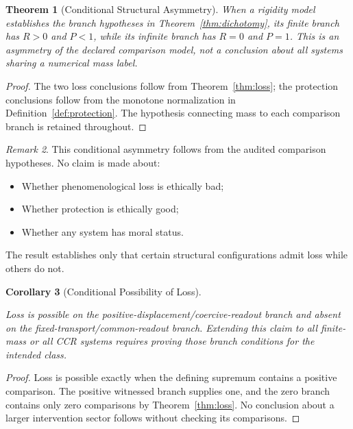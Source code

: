 \documentclass[11pt,a4paper]{article}
\theoremstyle{plain}
\newtheorem{theorem}{Theorem}[section]
\newtheorem{corollary}[theorem]{Corollary}
\theoremstyle{definition}
\theoremstyle{remark}
\newtheorem{remark}[theorem]{Remark}
\begin{document}
\begin{theorem}[Conditional Structural Asymmetry]\label{thm:asymmetry}
When a rigidity model establishes the branch hypotheses in Theorem~\ref{thm:dichotomy}, its finite branch has $R>0$ and $P<1$, while its infinite branch has $R=0$ and $P=1$. This is an asymmetry of the declared comparison model, not a conclusion about all systems sharing a numerical mass label.
\end{theorem}

\begin{proof}
The two loss conclusions follow from Theorem~\ref{thm:loss}; the protection conclusions follow from the monotone normalization in Definition~\ref{def:protection}. The hypothesis connecting mass to each comparison branch is retained throughout.
\end{proof}

\begin{remark}
This conditional asymmetry follows from the audited comparison hypotheses. No claim is made about:
\begin{itemize}[leftmargin=*]
    \item Whether phenomenological loss is ethically bad;
    \item Whether protection is ethically good;
    \item Whether any system has moral status.
\end{itemize}
The result establishes only that certain structural configurations admit loss while others do not.
\end{remark}

\begin{corollary}[Conditional Possibility of Loss]\label{cor:loss-possibility}\leavevmode\par
Loss is possible on the positive-displacement/coercive-readout branch and absent on the fixed-transport/common-readout branch. Extending this claim to all finite-mass or all CCR systems requires proving those branch conditions for the intended class.
\end{corollary}

\begin{proof}
Loss is possible exactly when the defining supremum contains a positive
comparison. The positive witnessed branch supplies one, and the zero branch
contains only zero comparisons by Theorem~\ref{thm:loss}. No conclusion
about a larger intervention sector follows without checking its comparisons.
\end{proof}
\end{document}
